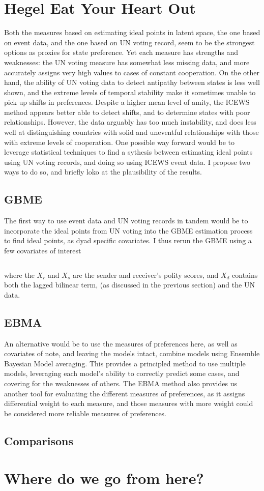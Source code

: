 \documentclass[12pt,onesided,fullpage]{amsart}
\begin{document}
\section{Hegel Eat Your Heart Out}
Both the measures based on estimating ideal points in latent space, the one based on event data, and the one based on UN voting record, seem to be the strongest options as proxies for state preference. Yet each measure has strengths and weaknesses: the UN voting measure has somewhat less missing data, and more accurately assigns very high values to cases of constant cooperation. On the other hand, the ability of UN voting data to detect antipathy between states is less well shown, and the extreme levels of temporal stability make it sometimes unable to pick up shifts in preferences. Despite a higher mean level of amity, the ICEWS method appears better able to detect shifts, and to determine states with poor relationships. However, the data arguably has too much instability, and does less well at distinguishing countries with solid and uneventful relationships with those with extreme levels of cooperation. One possible way forward would be to leverage statistical techniques to find a sythesis between estimating ideal points using UN voting records, and doing so using ICEWS event data. I propose two ways to do so, and briefly loko at the plausibility of the results.

\subsection{GBME}
The first way to use event data and UN voting records in tandem would be to incorporate the ideal points from UN voting into the GBME estimation process to find ideal points, as dyad specific covariates. I thus rerun the GBME using a few covariates of interest

\begin{equation}
\end{equation}

where the $X_r$ and $X_s$ are the sender and receiver's polity scores, and $X_d$ contains both the lagged bilinear term, (as discussed in the previous section) and the UN data. 


\subsection{EBMA}
An alternative would be to use the measures of preferences here, as well as covariates of note, and leaving the models intact, combine models using Ensemble Bayesian Model averaging. This provides a principled method to use multiple models, leveraging each model's ability to correctly predict some cases, and covering for the weaknesses of others. The EBMA method also provides us another tool for evaluating the different measures of preferences, as it assigns differential weight to each measure, and those measures with more weight could be considered more reliable measures of preferences.

\subsection{Comparisons}
\section{Where do we go from here?}
\end{document}
